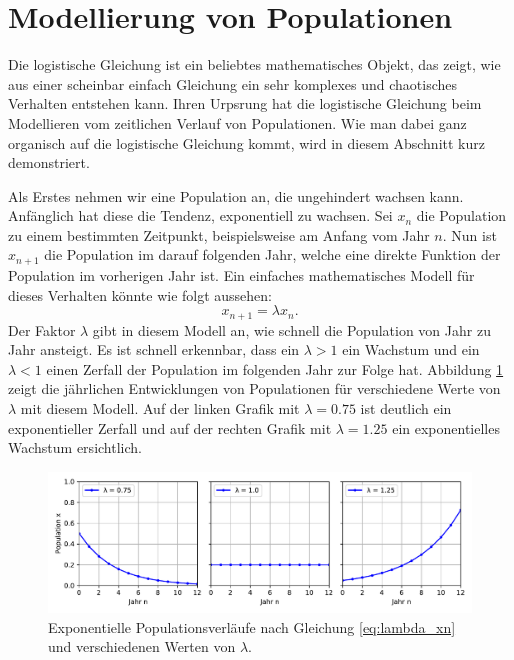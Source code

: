 %
%
%
\section{Modellierung von Populationen
\label{logistic:section:einleitung}}

Die logistische Gleichung ist ein beliebtes mathematisches Objekt,
das zeigt, wie aus einer scheinbar einfach Gleichung
ein sehr komplexes und chaotisches Verhalten entstehen kann. 
%
Ihren Urpsrung hat die logistische Gleichung beim Modellieren
vom zeitlichen Verlauf von Populationen. 
%
Wie man dabei ganz organisch auf die logistische Gleichung 
kommt, wird in diesem Abschnitt kurz demonstriert. 
%

Als Erstes nehmen wir eine Population an, 
die ungehindert wachsen kann. 
Anfänglich hat diese die Tendenz, exponentiell zu wachsen. 
%
Sei $x_{n}$ die Population zu einem bestimmten Zeitpunkt, 
beispielsweise am Anfang vom Jahr $n$. 
Nun ist $x_{n+1}$ die Population im darauf folgenden Jahr, 
welche eine direkte Funktion der Population im vorherigen
Jahr ist. 
Ein einfaches mathematisches Modell für dieses Verhalten
könnte wie folgt aussehen:
\begin{equation}
    \label{eq:lambda_xn}
    x_{n+1} = \lambda x_{n}\text{.}
\end{equation}
Der Faktor $\lambda$ gibt in diesem Modell an, 
wie schnell die Population von Jahr zu Jahr ansteigt. 
Es ist schnell erkennbar, 
dass ein $\lambda > 1$ ein Wachstum und
ein $\lambda < 1$ einen Zerfall
der Population im folgenden Jahr zur Folge hat. 
Abbildung \ref{fig:pop_exp} zeigt die jährlichen
Entwicklungen von Populationen für verschiedene
Werte von $\lambda$ mit diesem Modell.
Auf der linken Grafik mit $\lambda = 0.75$ ist deutlich
ein exponentieller Zerfall und auf 
der rechten Grafik mit $\lambda = 1.25$
ein exponentielles Wachstum ersichtlich.
\begin{figure}
    \includegraphics[width=\linewidth]{papers/logistic/figures/pop_exp.pdf}
    \caption{
        Exponentielle Populationsverläufe nach
        Gleichung \eqref{eq:lambda_xn}
        und verschiedenen Werten von $\lambda$.
    }
    \label{fig:pop_exp}
\end{figure}

